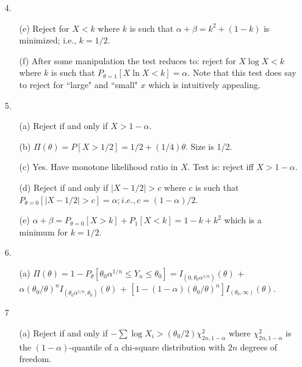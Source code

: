 \begin{enumerate}
	\item[4.] \begin{enumerate}
		\item[(e)] Reject for $X < k$ where $k$ is such that $\alpha + \beta = k^2 + (1-k)$ is minimized; i.e., $k=1/2$.
		\item[(f)] After some manipulation the test reduces to: reject for $X\log X < k$ where $k$ is such that $P_{\theta=1}[X\ln X < k] = \alpha$. Note that this test does say to reject for ``large" and ``small" $x$ which is intuitively appealing.
	\end{enumerate}

	\item[5.] \begin{enumerate}
		\item[(a)] Reject if and only if $X > 1-\alpha$.
		\item[(b)] $\Pi(\theta) = P[X>1/2] = 1/2 + (1/4)\theta$. Size is 1/2.
		\item[(c)] Yes. Have monotone likelihood ratio in $X$. Test is: reject iff $X > 1-\alpha$.

	\newpage
	
		\item[(d)] Reject if and only if $\vert X-1/2\vert > c$ where $c$ is such that $P_{\theta=0}[\vert X-1/2\vert > c] = \alpha; i.e., c = (1-\alpha)/2$.
		\item[(e)] $\alpha +\beta = P_{\theta=0}[X>k] + P_1[X<k] = 1-k+k^2$ which is a minimum for $k=1/2$.
	  \end{enumerate}	
  	
  	\item[6.] \begin{enumerate}
  		\item[(a)] $\Pi(\theta) = 1 - P_\theta[\theta_0\alpha^{1/n} \le Y_n \le \theta_0] = I_{(0,\theta_0\alpha^{1/n})}(\theta)$ + $\alpha(\theta_0/\theta)^nI_{(\theta_0\alpha^{1/n},\theta_0)}(\theta)$ + $[1-(1-\alpha)(\theta_0/\theta)^n]I_{(\theta_0,\infty)}(\theta)$. 
  	\end{enumerate}

  	\item[7] \begin{enumerate}
  		\item[(a)] Reject if and only if $-\sum\log X_i > (\theta_0/2)\chi^2_{2n,1-\alpha}$ where $\chi^2_{2n,1-\alpha}$  is the $(1-\alpha)$-quantile of a chi-square distribution with $2n$ degrees of freedom. 
  	\end{enumerate}


\end{enumerate}
